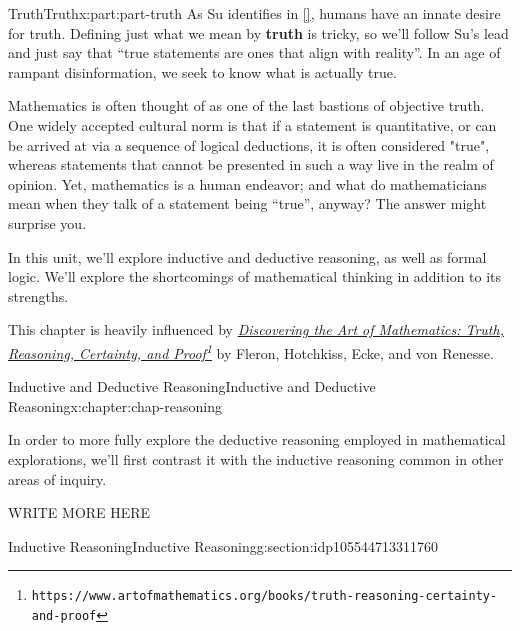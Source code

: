 \documentclass[oneside,10pt,]{book}
\newcommand{\xreffont}{\relax}
\newcommand{\terminology}[1]{\textbf{#1}}
\numberwithin{equation}{section}
\begin{document}
\begin{partptx}{Truth}{}{Truth}{}{}{x:part:part-truth}
 As Su identifies in \hyperlink{x:biblio:Su2020}{[{\xreffont 1}]}, humans have an innate desire for truth. Defining just what we mean by \terminology{truth} is tricky, so we'll follow Su's lead and just say that ``true statements are ones that align with reality''. In an age of rampant disinformation, we seek to know what is actually true.%
\par
Mathematics is often thought of as one of the last bastions of objective truth. One widely accepted cultural norm is that if a statement is quantitative, or can be arrived at via a sequence of logical deductions, it is often considered "true", whereas statements that cannot be presented in such a way live in the realm of opinion. Yet, mathematics is a human endeavor; and what do mathematicians mean when they talk of a statement being ``true'', anyway? The answer might surprise you.%
\par
In this unit, we'll explore inductive and deductive reasoning, as well as formal logic. We'll explore the shortcomings of mathematical thinking in addition to its strengths.%
\par
This chapter is heavily influenced by \emph{\href{https://www.artofmathematics.org/books/truth-reasoning-certainty-and-proof}{Discovering the Art of Mathematics: Truth, Reasoning, Certainty, and Proof}\footnote{\nolinkurl{https://www.artofmathematics.org/books/truth-reasoning-certainty-and-proof}\label{g:fn:idp105544713309200}}} by Fleron, Hotchkiss, Ecke, and von Renesse.%
%
\typeout{************************************************}
\typeout{************************************************}
%
\begin{chapterptx}{Inductive and Deductive Reasoning}{}{Inductive and Deductive Reasoning}{}{}{x:chapter:chap-reasoning}
\begin{introduction}{}%
In order to  more fully explore the deductive reasoning employed in mathematical explorations, we'll first contrast it with the inductive reasoning common in other areas of inquiry.%
\par
WRITE MORE HERE%
\end{introduction}%
%
%
\typeout{************************************************}
\typeout{************************************************}
%
\begin{sectionptx}{Inductive Reasoning}{}{Inductive Reasoning}{}{}{g:section:idp105544713311760}

\end{sectionptx}
\end{chapterptx}
\end{partptx}
\end{document}
